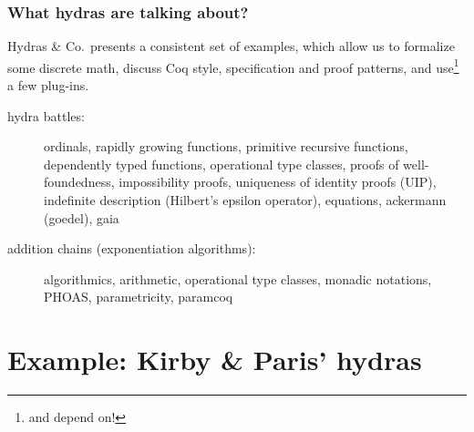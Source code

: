 \documentclass[10pt]{beamer}
\newcommand{\coq}{Coq\xspace}
\newcommand{\Hydras}{Hydras \& Co$\text.$\xspace}
\begin{document}

\begin{frame}
  \frametitle{What hydras are talking about?}
  \begin{block}{}
    \Hydras presents a consistent set of examples, which allow us to formalize 
    some \textcolor{mathcolor}{discrete math}, discuss
    \textcolor{coqstylecolor}{\coq style, specification and proof patterns}, and use\footnote{and depend on!} \textcolor{plugincolor}{a few plug-ins}.
  \end{block}
  \begin{block}{}
    \begin{description}
    \item[hydra battles:]
      
      \textcolor{mathcolor}{ordinals},
      \textcolor{mathcolor}{rapidly growing functions},
      \textcolor{mathcolor}{primitive recursive functions}, 
      \textcolor{coqstylecolor}{dependently typed functions},
      \textcolor{coqstylecolor}{operational type classes},
      \textcolor{coqstylecolor}{proofs of well-foundedness},
      \textcolor{coqstylecolor}{impossibility proofs},
      \textcolor{coqstylecolor}{uniqueness of identity proofs (UIP)},
      \textcolor{coqstylecolor}{indefinite description (Hilbert's epsilon operator)}, 
      \textcolor{plugincolor}{equations},
      \textcolor{plugincolor}{ackermann (goedel)},
      \textcolor{plugincolor}{gaia}
      
    \item[addition chains (exponentiation algorithms):]
      \textcolor{mathcolor}{algorithmics},
      \textcolor{mathcolor}{arithmetic},
      \textcolor{coqstylecolor}{operational type classes},
      \textcolor{coqstylecolor}{monadic notations},
      \textcolor{coqstylecolor}{PHOAS},
      \textcolor{coqstylecolor}{parametricity}, 
      \textcolor{plugincolor}{paramcoq}
    \end{description}
  \end{block}
\end{frame}


\section{Example: Kirby \& Paris' hydras}
\end{document}
